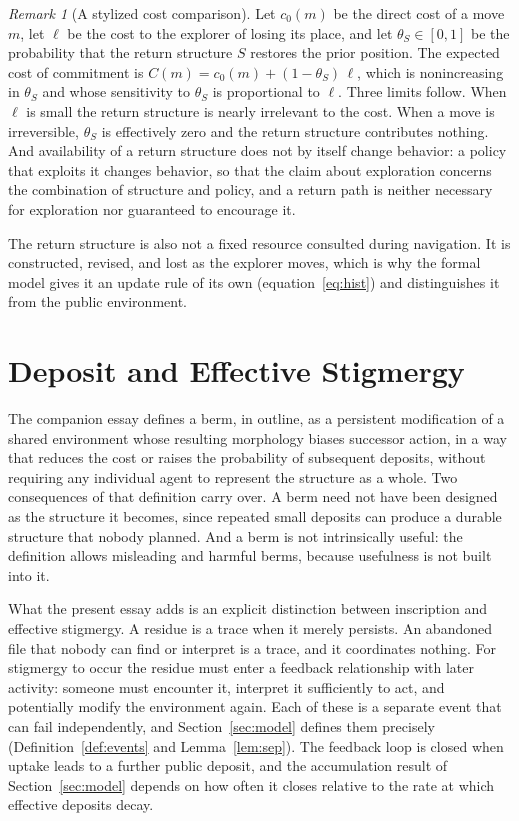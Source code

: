 \documentclass[11pt]{article}
\theoremstyle{definition}
\theoremstyle{remark}
\newtheorem{remark}[proposition]{Remark}
\begin{document}
\begin{remark}[A stylized cost comparison]
Let $c_0(m)$ be the direct cost of a move $m$, let $\ell$ be the cost to the explorer of losing its place, and let $\theta_S\in[0,1]$ be the probability that the return structure $S$ restores the prior position. The expected cost of commitment is $C(m)=c_0(m)+(1-\theta_S)\,\ell$, which is nonincreasing in $\theta_S$ and whose sensitivity to $\theta_S$ is proportional to $\ell$. Three limits follow. When $\ell$ is small the return structure is nearly irrelevant to the cost. When a move is irreversible, $\theta_S$ is effectively zero and the return structure contributes nothing. And availability of a return structure does not by itself change behavior: a policy that exploits it changes behavior, so that the claim about exploration concerns the combination of structure and policy, and a return path is neither necessary for exploration nor guaranteed to encourage it.
\end{remark}

The return structure is also not a fixed resource consulted during navigation. It is constructed, revised, and lost as the explorer moves, which is why the formal model gives it an update rule of its own (equation~\eqref{eq:hist}) and distinguishes it from the public environment.

\section{Deposit and Effective Stigmergy}\label{sec:deposit}

The companion essay defines a berm, in outline, as a persistent modification of a shared environment whose resulting morphology biases successor action, in a way that reduces the cost or raises the probability of subsequent deposits, without requiring any individual agent to represent the structure as a whole. Two consequences of that definition carry over. A berm need not have been designed as the structure it becomes, since repeated small deposits can produce a durable structure that nobody planned. And a berm is not intrinsically useful: the definition allows misleading and harmful berms, because usefulness is not built into it.

What the present essay adds is an explicit distinction between inscription and effective stigmergy. A residue is a trace when it merely persists. An abandoned file that nobody can find or interpret is a trace, and it coordinates nothing. For stigmergy to occur the residue must enter a feedback relationship with later activity: someone must encounter it, interpret it sufficiently to act, and potentially modify the environment again. Each of these is a separate event that can fail independently, and Section~\ref{sec:model} defines them precisely (Definition~\ref{def:events} and Lemma~\ref{lem:sep}). The feedback loop is closed when uptake leads to a further public deposit, and the accumulation result of Section~\ref{sec:model} depends on how often it closes relative to the rate at which effective deposits decay.
\end{document}
